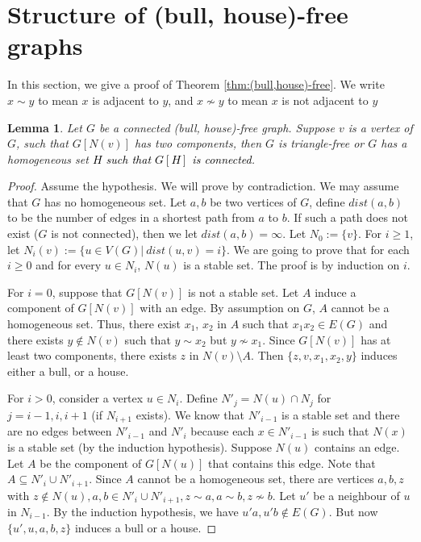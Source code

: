 \documentclass[a4paper,11pt]{article}
\newtheorem{lemma}[theorem]{Lemma}
\theoremstyle{case}
\newcommand{\thecolor}{black}
\begin{document}

\section{Structure of (bull, house)-free graphs}\label{sec:structure}                                                     
In this section, we give a proof of Theorem \ref{thm:(bull,house)-free}.
We write $x \sim y$ to mean $x$ is adjacent to $y$, and $x \not\sim y$ to mean $x$ is not adjacent to $y$
\begin{lemma}\label{lem:split-vertex}
    Let $G$ be a connected (bull, house)-free graph. Suppose $v$ is a vertex of $G$, such that $G[N(v)]$ has two components, then $G$ is triangle-free or $G$ has a  homogeneous set \textcolor{\thecolor}{$H$ such that $G[H]$ is connected}.
\end{lemma}
\begin{proof}
    Assume the hypothesis. We will prove by contradiction. We may assume that $G$ has no homogeneous set. Let $a,b$ be two vertices of $G$, define $dist(a,b)$ to be the number of edges in a shortest path from $a$ to $b$. If such a path does not exist ($G$ is not connected), then we let $dist(a,b) = \infty$.
    Let $N_0 := \{v\}$. For $i\ge 1$, let $N_{i}(v) := \{u\in V(G) | ~dist(u, v)=i\}$. %
    We are going to prove that for each $i \ge 0$ and for every $u\in N_{i}$, $N(u)$ is a stable set. The proof is by induction on $i$.

    For $i = 0$, suppose that $G[N(v)]$ is not a stable set.  Let $A$ induce a component of $G[N(v)]$ with an edge. By assumption on $G$, $A$ cannot be a homogeneous set. Thus, there exist $x_1$, $x_2$ in $A$ such that $x_1x_2 \in E(G)$ and there exists $y\notin N(v)$ such that $y \sim x_2$  but  $y \not\sim x_1$. Since $G[N(v)]$ has at least two components, there exists $z$ in $N(v)\setminus A$. 
    Then $\{z,v,x_1,x_2,y\}$ induces either a bull, or a house.

    For $i > 0$, consider a vertex $u \in N_i$. Define $N'_j = N(u) \cap N_j$ for $j = i-1, i , i+1$ (if $N_{i+1} $  exists). We know that $N'_{i-1}$ is a stable set and there are no edges between $N'_{i-1}$ and $N'_{i}$ because each $x \in N'_{i-1}$ is such that $N(x)$ is a stable set (by the induction hypothesis). Suppose $N(u)$ contains an edge. Let $A$ be the component of $G[N(u)]$ that contains this edge. Note that $A \subseteq N'_i \cup N'_{i+1}$. Since $A$ cannot be a homogeneous set, there are vertices $a,b,z$ with  $z \notin N(u), a,b \in N'_i \cup N'_{i+1} , z \sim a, a \sim b , z \not\sim b$.    Let $u'$  be a neighbour of $u$ in $N_{i-1}$. By the induction hypothesis, we have $u'a, u'b \notin E(G)$.  But now $\{u', u, a, b, z\}$ induces a bull or a house. 
\end{proof}
\end{document}
